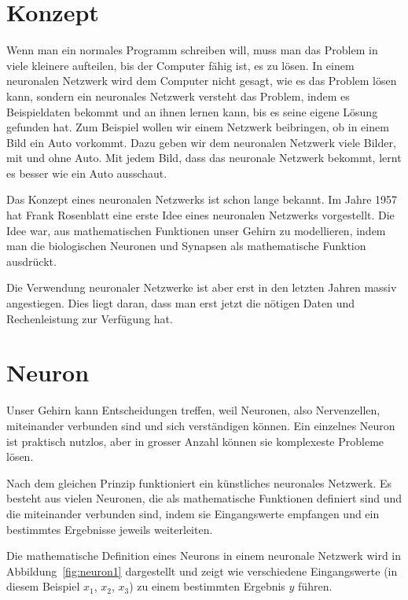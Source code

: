 \documentclass[12pt,a4paper]{report}
\begin{document}
\section{Konzept}\label{sec:konzept}
Wenn man ein normales Programm schreiben will, muss man das Problem in viele kleinere aufteilen, bis der Computer fähig ist,
es zu lösen.
In einem neuronalen Netzwerk wird dem Computer nicht gesagt, wie es das Problem lösen kann, sondern ein neuronales Netzwerk
versteht das Problem, indem es Beispieldaten bekommt und an ihnen lernen kann, bis es seine eigene Lösung gefunden hat.
Zum Beispiel wollen wir einem Netzwerk beibringen, ob in einem Bild ein Auto vorkommt.
Dazu geben wir dem neuronalen Netzwerk viele Bilder, mit und ohne Auto.
Mit jedem Bild, dass das neuronale Netzwerk bekommt, lernt es besser wie ein Auto ausschaut.

Das Konzept eines neuronalen Netzwerks ist schon lange bekannt.
Im Jahre 1957 hat Frank Rosenblatt eine erste Idee eines neuronalen Netzwerks vorgestellt.
Die Idee war, aus mathematischen Funktionen unser Gehirn zu modellieren,
indem man die biologischen Neuronen und Synapsen als mathematische Funktion ausdrückt.

Die Verwendung neuronaler Netzwerke ist aber erst in den letzten Jahren massiv angestiegen.
Dies liegt daran, dass man erst jetzt die nötigen Daten
und Rechenleistung zur Verfügung hat.

\section{Neuron}\label{sec:neuron}
Unser Gehirn kann Entscheidungen treffen, weil Neuronen, also Nervenzellen,  miteinander verbunden sind und sich
verständigen können.
Ein einzelnes Neuron ist praktisch nutzlos, aber in grosser Anzahl können sie komplexeste Probleme lösen.

Nach dem gleichen Prinzip funktioniert ein künstliches neuronales Netzwerk.
Es besteht aus vielen Neuronen, die als mathematische Funktionen definiert sind und die miteinander verbunden sind,
indem sie Eingangswerte empfangen und ein bestimmtes Ergebnisse jeweils weiterleiten.

Die mathematische Definition eines Neurons in einem neuronale Netzwerk wird in Abbildung~\ref{fig:neuron1} dargestellt
und zeigt wie verschiedene Eingangswerte (in diesem Beispiel $x_1$, $x_2$, $x_3$) zu einem bestimmten Ergebnis $y$ führen.
\end{document}
